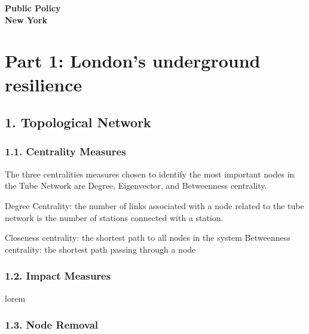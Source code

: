 \documentclass[10pt]{report}
\author{the author}
\numberwithin{figure}{section}
\numberwithin{table}{section}
\begin{document}

\begin{center}
    \vspace*{-3cm}
\end{center}   
    {\LARGE\textbf{Public Policy\\
    New York\\}}
    

\section{Part 1: London’s underground resilience}


 \subsection{1. Topological Network}
\subsubsection{1.1. Centrality Measures } 
        The three centralities measures chosen to identify the most important nodes in the Tube Network are Degree, Eigenvector, and Betweenness centrality.
        
        
        Degree Centrality: the number of links associated with a node related to the tube network is the number of stations connected with a station. 

        
        Closeness centrality:  the shortest path to all nodes in the system
        Betweenness centrality: the shortest path passing through a node

\subsubsection{1.2. Impact Measures} 
lorem

\subsubsection{1.3. Node Removal} 
\end{document}

